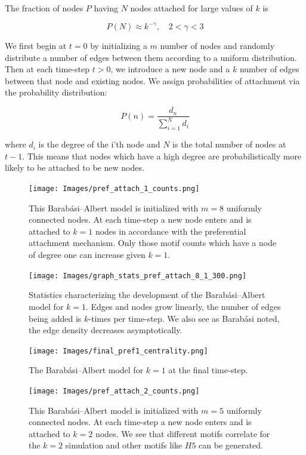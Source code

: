 The fraction of nodes $P$ having $N$ nodes attached for large values of $k$ is 

$$
P(N) \approx k^{-\gamma} , \quad 2< \gamma <3
$$

We first begin at $t=0$ by initializing a $m$ number of nodes and randomly distribute a number of edges between them
according to a uniform distribution. Then at each time-step $t > 0$, we introduce a new node 
and a $k$ number of edges between that node and existing nodes. We assign probabilities of attachment via the
 probability distribution:

$$
P(n) = \frac{d_n}{\sum^{N}_{i=1} d_i}
$$

\noindent where $d_i$ is the degree of the i'th node and $N$ is the total number of nodes at $t-1$. This means 
that nodes which have a high degree are probabilistically more likely to be attached to be new nodes. 


\begin{figure}[h!]
    \texttt{[image: Images/pref\_attach\_1\_counts.png]}
    \centering
    \caption{This Barabási–Albert model is initialized with $m=8$ uniformly connected nodes.
    At each time-step a new node enters and is attached to $k=1$ nodes in accordance
    with the preferential attachment mechanism. Only those motif counts which have a node
    of degree one can increase given $k=1$.}
    \label{fig:BA1}
\end{figure}


\begin{figure}[h!]
    \texttt{[image: Images/graph\_stats\_pref\_attach\_8\_1\_300.png]}
    \centering
    \caption{Statistics characterizing the development of the Barabási–Albert model for $k=1$.
    Edges and nodes grow linearly, the number of edges being added is $k$-times per time-step. We also 
    see as Barabási noted, the edge density decreases asymptotically.}
\end{figure}


\begin{figure}
    \texttt{[image: Images/final\_pref1\_centrality.png]}
    \centering
    \caption{The Barabási–Albert model for $k=1$ at the final time-step.}
\end{figure}

\begin{figure}[h!]
    \texttt{[image: Images/pref\_attach\_2\_counts.png]}
    \centering
    \caption{This Barabási–Albert model is initialized with $m=5$ uniformly connected nodes.
    At each time-step a new node enters and is attached to $k=2$ nodes. We see that different motifs
    correlate for the $k=2$ simulation and other motifs like $H5$ can be generated.}
    \label{fig:BA2}
\end{figure}

